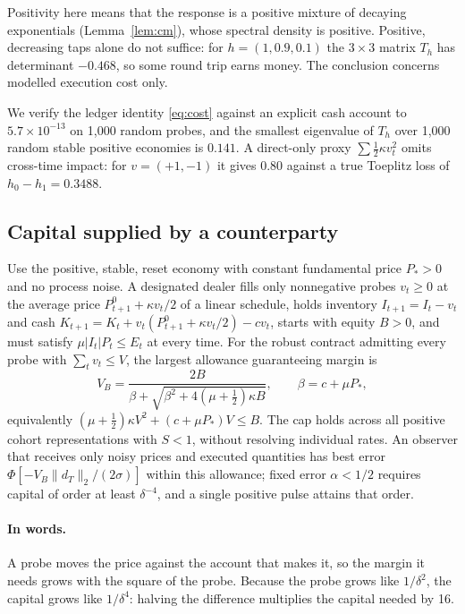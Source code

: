 Positivity here means that the response is a positive mixture of decaying exponentials (Lemma~\ref{lem:cm}), whose spectral density is positive. Positive, decreasing taps alone do not suffice: for $h=(1,0.9,0.1)$ the $3\times3$ matrix $T_h$ has determinant $-0.468$, so some round trip earns money. The conclusion concerns modelled execution cost only.

We verify the ledger identity \eqref{eq:cost} against an explicit cash account to $5.7\times10^{-13}$ on 1,000 random probes, and the smallest eigenvalue of $T_h$ over 1,000 random stable positive economies is $0.141$. A direct-only proxy $\sum\tfrac12\kappa v_t^2$ omits cross-time impact: for $v=(+1,-1)$ it gives $0.80$ against a true Toeplitz loss of $h_0-h_1=0.3488$.

\subsection{Capital supplied by a counterparty}

\begin{theorem}\label{thm:cap}
Use the positive, stable, reset economy with constant fundamental price $P_*>0$ and no process noise. A designated dealer fills only nonnegative probes $v_t\ge0$ at the average price $P^0_{t+1}+\kappa v_t/2$ of a linear schedule, holds inventory $I_{t+1}=I_t-v_t$ and cash $K_{t+1}=K_t+v_t(P^0_{t+1}+\kappa v_t/2)-cv_t$, starts with equity $B>0$, and must satisfy $\mu|I_t|P_t\le E_t$ at every time. For the robust contract admitting every probe with $\sum_tv_t\le V$, the largest allowance guaranteeing margin is
\begin{equation}\label{eq:VB}
V_B=\frac{2B}{\beta+\sqrt{\beta^2+4(\mu+\tfrac12)\kappa B}},\qquad\beta=c+\mu P_*,
\end{equation}
equivalently $(\mu+\tfrac12)\kappa V^2+(c+\mu P_*)V\le B$. The cap holds across all positive cohort representations with $S<1$, without resolving individual rates. An observer that receives only noisy prices and executed quantities has best error $\Phi[-V_B\|d_T\|_2/(2\sigma)]$ within this allowance; fixed error $\alpha<1/2$ requires capital of order at least $\delta^{-4}$, and a single positive pulse attains that order.
\end{theorem}

\paragraph{In words.} A probe moves the price against the account that makes it, so the margin it needs grows with the square of the probe. Because the probe grows like $1/\delta^2$, the capital grows like $1/\delta^4$: halving the difference multiplies the capital needed by 16.


